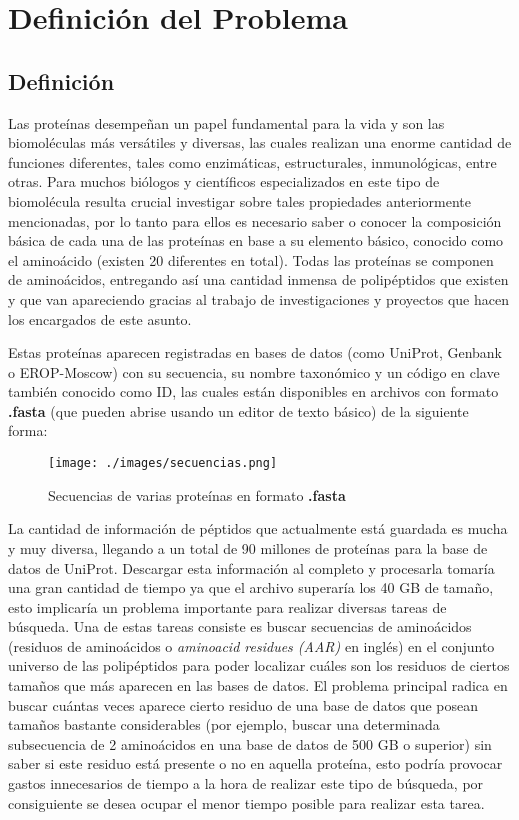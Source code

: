 \chapter{Definición del Problema}

\section{Definición}

Las proteínas desempeñan un papel fundamental para la vida y son las biomoléculas más versátiles y diversas, las cuales realizan una enorme cantidad de funciones diferentes, tales como enzimáticas, estructurales, inmunológicas, entre otras. Para muchos biólogos y científicos especializados en este tipo de biomolécula resulta crucial investigar sobre tales propiedades anteriormente mencionadas, por lo tanto para ellos es necesario saber o conocer la composición básica de cada una de las proteínas en base a su elemento básico, conocido como el aminoácido (existen 20 diferentes en total). Todas las proteínas se componen de aminoácidos, entregando así una cantidad inmensa de polipéptidos que existen y que van apareciendo gracias al trabajo de investigaciones y proyectos que hacen los encargados de este asunto.

Estas proteínas aparecen registradas en bases de datos (como UniProt, Genbank o EROP-Moscow) con su secuencia, su nombre taxonómico y un código en clave también conocido como ID, las cuales están disponibles en archivos con formato \textbf{.fasta} \cite{fasta} (que pueden abrise usando un editor de texto básico) de la siguiente forma:

\begin{figure}[ht]
    \centering
    \texttt{[image: ./images/secuencias.png]}
    \caption{Secuencias de varias proteínas en formato \textbf{.fasta}}
    \label{fig:image4}
\end{figure}


La cantidad de información de péptidos que actualmente está guardada es mucha y muy diversa, llegando a un total de 90 millones de proteínas para la base de datos de UniProt. Descargar esta información al completo y procesarla tomaría una gran cantidad de tiempo ya que el archivo superaría los 40 GB de tamaño, esto implicaría un problema importante para realizar diversas tareas de búsqueda. Una de estas tareas consiste es buscar secuencias de aminoácidos (residuos de aminoácidos o \textit{aminoacid residues (AAR)} en inglés) en el conjunto universo de las polipéptidos para poder localizar cuáles son los residuos de ciertos tamaños que más aparecen en las bases de datos. El problema principal radica en buscar cuántas veces aparece cierto residuo de una base de datos que posean tamaños bastante considerables (por ejemplo, buscar una determinada subsecuencia de 2 aminoácidos en una base de datos de 500 GB o superior) sin saber si este residuo está presente o no en aquella proteína, esto podría provocar gastos innecesarios de tiempo a la hora de realizar este tipo de búsqueda, por consiguiente se desea ocupar el menor tiempo posible para realizar esta tarea.

